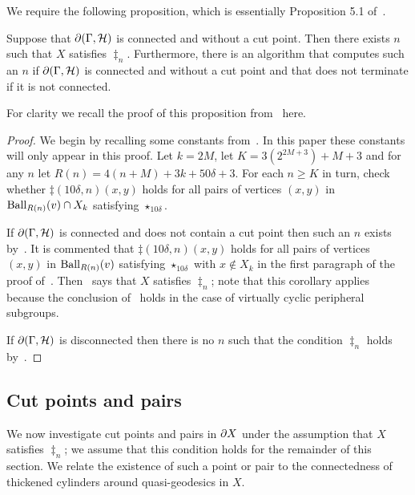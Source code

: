 We require the following proposition, which is essentially Proposition 5.1
of~\cite{dahmanigroves08a}.

\begin{prop}\label{prop:Xsatisfiesddag} Suppose that $\partial(\Gamma,
\mathcal{H})$ is connected and without a cut point. Then there exists $n$
such that $X$ satisfies $\ddag_n$. Furthermore, there is an algorithm that
computes such an $n$ if $\partial(\Gamma, \mathcal{H})$ is connected and
without a cut point and that does not terminate if it is not connected.
\end{prop}

For clarity we recall the proof of this proposition
from~\cite{dahmanigroves08a} here.

\begin{proof} We begin by recalling some constants
from~\cite{dahmanigroves08a}. In this paper these constants will only appear
in this proof. Let $k = 2M$, let $K = 3(2^{2M+3}) + M + 3$ and for any $n$
let $R(n) = 4(n + M) + 3k + 50\delta + 3$. For each $n \geq K$ in turn, check
whether $\ddag(10\delta, n)(x, y)$ holds for all pairs of vertices $(x, y)$
in $\operatorname{\mathrm{Ball}}_{R(n)}(v) \cap X_k$ satisfying $\star_{10\delta}$. 

If $\partial(\Gamma, \mathcal{H})$ is connected and does not contain a cut
point then such an $n$ exists by~\cite[Lemma 4.2]{dahmanigroves08a}. It is
commented that $\ddag(10\delta, n)(x, y)$ holds for all pairs of vertices $(x,
y)$ in $\operatorname{\mathrm{Ball}}_{R(n)}(v)$ satisfying $\star_{10\delta}$ with $x \notin X_k$ in the
first paragraph of the proof of~\cite[Lemma 2.16]{dahmanigroves08a}.
Then~\cite[Corollary 4.6]{dahmanigroves08a} says that $X$ satisfies $\ddag_n$; note
that this corollary applies because the conclusion 
of~\cite[Lemma 2.16]{dahmanigroves08a} holds in the case of virtually cyclic
peripheral subgroups.

If $\partial(\Gamma, \mathcal{H})$ is disconnected then there is no $n$ such
that the condition $\ddag_n$ holds by~\cite[Lemma~4.1]{dahmanigroves08a}.  \end{proof}

\subsection{Cut points and pairs}\label{sec:annulus} 

We now investigate cut points and pairs in $\partial X$ under the assumption
that $X$ satisfies $\ddag_n$; we assume that this condition holds for the
remainder of this section. We relate the existence of such a point or pair to
the connectedness of thickened cylinders around quasi-geodesics in $X$.


